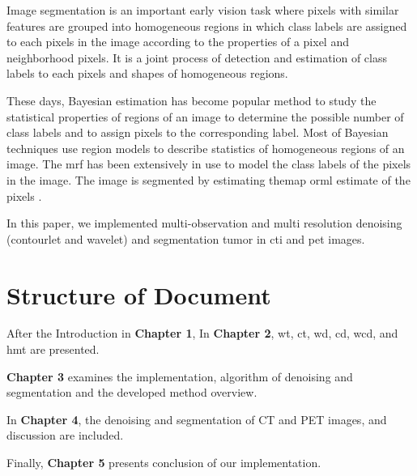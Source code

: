 Image segmentation is an important early vision task where pixels with similar features are grouped into homogeneous regions in which  class labels are assigned to each pixels in the image according to the properties of a pixel and neighborhood pixels. It is a joint process of detection and estimation of class labels to each pixels and shapes of homogeneous regions. 

These days, Bayesian estimation has become popular method to study the statistical properties of regions of an image to determine the possible number of class labels and to assign pixels to the corresponding label. Most of Bayesian techniques use region models to describe statistics of homogeneous regions of an image. The \gls{mrf} has been extensively in use to model the class labels of the pixels in the image. The image is segmented by estimating the\gls{map}  or\gls{ml} estimate of the pixels\cite{choi1999image} \cite{voisin2014supervised}.

In this paper, we implemented  multi-observation and multi resolution  denoising (contourlet and wavelet) and segmentation tumor in \gls{cti} and \gls{pet} images.


\section{Structure of Document}

After the Introduction in \textbf{Chapter 1}, In \textbf{Chapter 2}, \gls{wt}, \gls{ct}, \gls{wd}, \gls{cd}, \gls{wcd}, and \gls{hmt} are presented.

\textbf{Chapter 3} examines the implementation, algorithm of denoising and segmentation and the developed method overview.
 
In \textbf{Chapter 4}, the denoising and segmentation of CT and PET images, and discussion are included. 

Finally, \textbf{Chapter 5} presents conclusion of our implementation.